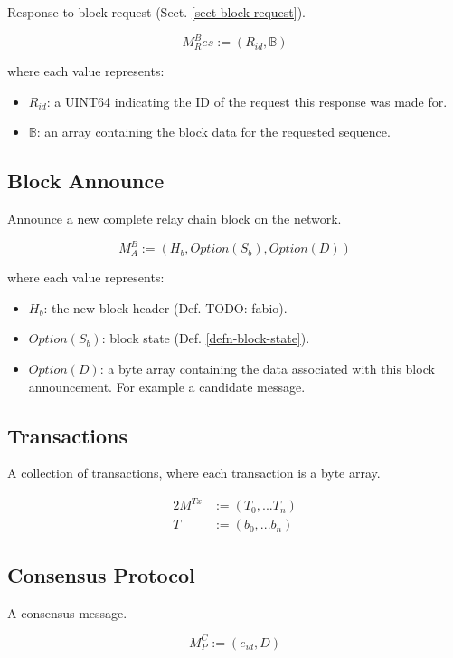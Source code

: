 \documentclass{book}
\newcommand{\todo}[1]{}
\renewcommand{\todo}[1]{{\color{red} TODO: {#1}}}
\begin{document}
Response to block request (Sect. \ref{sect-block-request}).

\[
    M^B_Res := (R_{id}, \mathbb{B})
\]

where each value represents:

\begin{itemize}
    \item $R_{id}$: a UINT64 indicating the ID of the request this response was
    made for.
    \item $\mathbb{B}$: an array containing the block data for the requested
    sequence.
\end{itemize}

\subsection{Block Announce}

Announce a new complete relay chain block on the network.

\[
    M^B_A := (H_b, Option(S_b), Option(D))
\]

where each value represents:

\begin{itemize}
    \item $H_b$: the new block header (Def. \todo{fabio}).
    \item $Option(S_b)$: block state (Def. \ref{defn-block-state}).
    \item $Option(D)$: a byte array containing the data associated with this
    block announcement. For example a candidate message.
\end{itemize}

\subsection{Transactions}

A collection of transactions, where each transaction is a byte array.

\begin{alignat*}{2}
    M^{Tx} &:= (T_0, ... T_n) \\
    T &:= (b_0, ... b_n)
\end{alignat*}

\subsection{Consensus Protocol}

A consensus message.

\[
    M^C_P := (e_{id}, D)
\]
\end{document}

